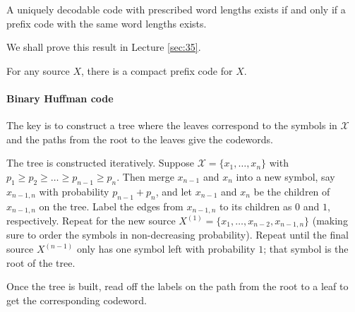 \begin{theorem}
A uniquely decodable code with prescribed word lengths exists if and only if a prefix code with the same word lengths exists.
\end{theorem}

We shall prove this result in Lecture \ref{sec:35}.

\begin{corollary}
For any source $X$, there is a compact prefix code for $X$.
\end{corollary}


\paragraph{Binary Huffman code}


The key is to construct a tree where the leaves correspond to the symbols in  $\mathcal{X}$ and the paths from the root to the leaves give the codewords.

The tree is constructed iteratively. Suppose $\mathcal{X} = \{x_1, \dots, x_n\}$ with $p_1 \ge p_2 \ge  \dots \ge p_{n-1} \ge p_n$. Then merge $x_{n-1}$ and $x_n$ into a new symbol, say $x_{n-1, n}$ with probability $p_{n-1} + p_n$, and let $x_{n-1}$ and $x_n$ be the children of $x_{n-1, n}$ on the tree. Label the edges from $x_{n-1, n}$ to its children as $0$ and $1$, respectively. Repeat for the new source $X^{(1)} = \{x_1, \dots, x_{n-2}, x_{n-1, n} \}$ (making sure to order the symbols in non-decreasing probability). Repeat until the final source $X^{(n-1)}$ only has one symbol left with probability $1$; that symbol is the root of the tree. 

Once the tree is built, read off the labels on the path from the root to a leaf to get the corresponding codeword.

